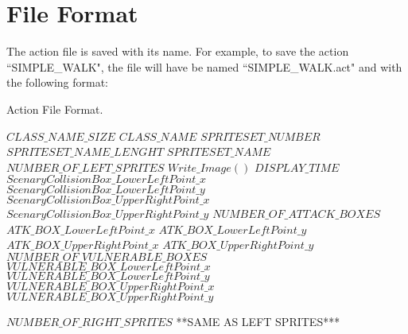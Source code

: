 	\section{File Format}
	  The action file is saved with its name. For example, to save the action ``SIMPLE\_WALK", the file will have be named ``SIMPLE\_WALK.act" and with the following format:
	  \begin{algorithm}[H]
	      \caption{Action File Format.}
	      \label{algoEvalCuda}
	      \begin{algorithmic}
			\STATE [int]$CLASS\_NAME\_SIZE$
			\STATE [byte*] $CLASS\_NAME$
			\STATE [int] $SPRITESET\_NUMBER$
			  \STATE [int]$SPRITESET\_NAME\_LENGHT$
			  \STATE [byte*]$SPRITESET\_NAME$
			  \STATE [int]$NUMBER\_OF\_LEFT\_SPRITES$
				  \STATE [image] $Write\_Image()$						
			      \STATE [double]$DISPLAY\_TIME$			      
				  \STATE [double] $ScenaryCollisionBox\_LowerLeftPoint\_x$
				  \STATE [double] $ScenaryCollisionBox\_LowerLeftPoint\_y$
				  \STATE [double] $ScenaryCollisionBox\_UpperRightPoint\_x$
				  \STATE [double] $ScenaryCollisionBox\_UpperRightPoint\_y$	
				  \STATE [int] $NUMBER\_OF\_ATTACK\_BOXES$
					\STATE [double] $ATK\_BOX\_LowerLeftPoint\_x$
					\STATE [double] $ATK\_BOX\_LowerLeftPoint\_y$
					\STATE [double] $ATK\_BOX\_UpperRightPoint\_x$
					\STATE [double] $ATK\_BOX\_UpperRightPoint\_y$	
				  \ENDFOR
				  \STATE [int] $NUMBER\_OF\_VULNERABLE\_BOXES$
					\STATE [double] $VULNERABLE\_BOX\_LowerLeftPoint\_x$
					\STATE [double] $VULNERABLE\_BOX\_LowerLeftPoint\_y$
					\STATE [double] $VULNERABLE\_BOX\_UpperRightPoint\_x$
					\STATE [double] $VULNERABLE\_BOX\_UpperRightPoint\_y$	
				  \ENDFOR
				  
			  \ENDFOR
			  \STATE [int]$NUMBER\_OF\_RIGHT\_SPRITES$
			  \STATE ***SAME AS LEFT SPRITES***
			\ENDFOR
		  \end{algorithmic}
		 \end{algorithm}
		 
